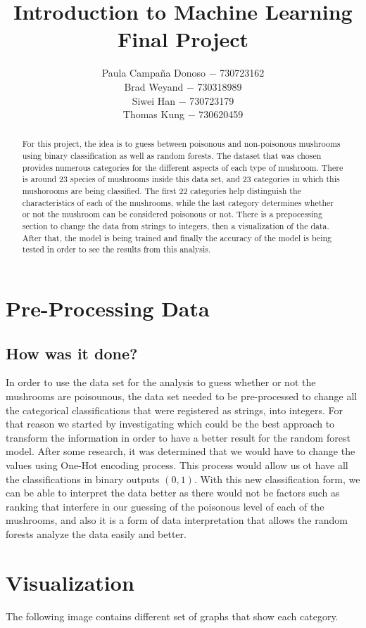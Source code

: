 \documentclass[]{article}
\title{Introduction to Machine Learning Final Project}
\author{Paula Campaña Donoso $-$ 730723162 \\ Brad Weyand $-$ 730318989 \\ Siwei Han $-$ 730723179 \\ Thomas Kung $-$ 730620459}
\begin{document}
\maketitle

\begin{abstract}
For this project, the idea is to guess between poisonous and non-poisonous mushrooms using binary classification as well as random forests. The dataset that was chosen provides numerous categories for the different aspects of each type of mushroom. There is around 23 species of mushrooms inside this data set, and 23 categories in which this mushorooms are being classified. The first 22 categories help distinguish the characteristics of each of the mushrooms, while the last category determines whether or not the mushroom can be considered poisonous or not. There is a prepocessing section to change the data from strings to integers, then a visualization of the data. After that, the model is being trained and finally the accuracy of the model is being tested in order to see the results from this analysis.
\end{abstract}

\section{Pre-Processing Data}

\subsection{How was it done?}
In order to use the data set for the analysis to guess whether or not the mushrooms are poisounous, the data set needed to be pre-processed to change all the categorical classifications that were registered as strings, into integers. For that reason we started by investigating which could be the best approach to transform the information in order to have a better result for the random forest model. After some research, it was determined that we would have to change the values using One-Hot encoding process. This process would allow us ot have all the classifications in binary outputs $(0,1)$. With this new classification form, we can be able to interpret the data better as there would not be factors such as ranking that interfere in our guessing of the poisonous level of each of the mushrooms, and also it is a form of data interpretation that allows the random forests analyze the data easily and better.

\section{Visualization}
The following image contains different set of graphs that show each category.
\end{document}
